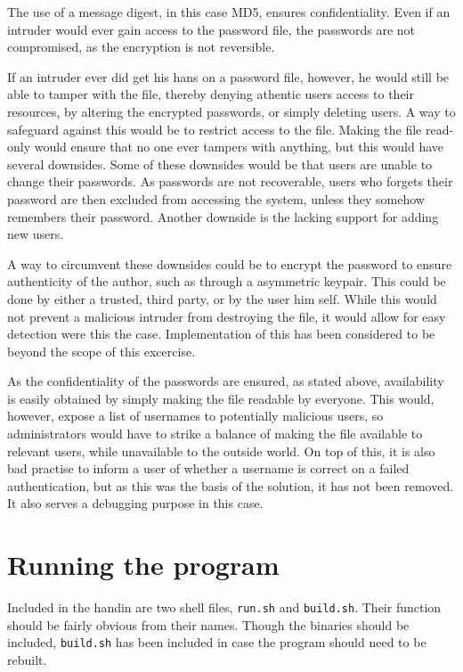 \documentclass{article}
\begin{document}
The use of a message digest, in this case MD5, ensures confidentiality.
Even if an intruder would ever gain access to the password file, the passwords
are not compromised, as the encryption is not reversible.

If an intruder ever did get his hans on a password file, however, he would still be able
to tamper with the file, thereby denying athentic users access to their resources, by
altering the encrypted passwords, or simply deleting users.
A way to safeguard against this would be to restrict access to the file.
Making the file read-only would ensure that no one ever tampers with anything,
but this would have several downsides. Some of these downsides would be that users are unable
to change their passwords. As passwords are not recoverable, users who forgets their
password are then excluded from accessing the system, unless they somehow remembers their password.
Another downside is the lacking support for adding new users.

A way to circumvent these downsides could be to encrypt the password to ensure
authenticity of the author, such as through a asymmetric keypair. 
This could be done by either a trusted, third party, or by
the user him self. While this would not prevent a malicious intruder from destroying the file,
it would allow for easy detection were this the case.
Implementation of this has been considered to be beyond the scope of this excercise.

As the confidentiality of the passwords are ensured, as stated above,
availability is easily obtained by simply making the file readable by everyone.
This would, however, expose a list of usernames to potentially malicious users,
so administrators would have to strike a balance of making the file available
to relevant users, while unavailable to the outside world.
On top of this, it is also bad practise to inform a user of whether a username is correct
on a failed authentication, but as this was the basis of the solution, it has not been removed.
It also serves a debugging purpose in this case.

\section{Running the program}
Included in the handin are two shell files, \texttt{run.sh} and \texttt{build.sh}.
Their function should be fairly obvious from their names.
Though the binaries should be included, \texttt{build.sh} has been included in case
the program should need to be rebuilt.
\end{document}
